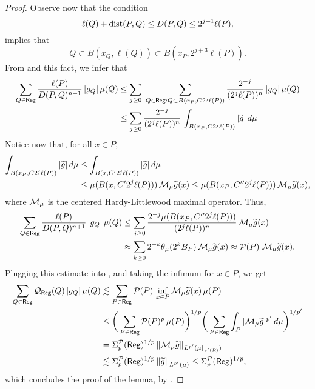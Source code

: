 \begin{proof}
Observe now that the condition
$$\ell(Q) + {\rm dist}(P,Q)\leq D(P,Q)\leq 2^{j+1}\ell(P),$$
implies that 
$$Q\subset B(x_Q,\ell(Q))\subset B(x_P,2^{j+3}\ell(P)).$$
From  and this fact, we infer that
\begin{align*}
\sum_{Q\in{\mathsf{Reg}}} \frac{\ell(P)}{D(P,Q)^{n+1}}\,|g_Q|\,\mu(Q) &
\leq  \sum_{j\geq0}\;
\sum_{Q\in{\mathsf{Reg}}:Q\subset B(x_P,C2^j\ell(P))} \frac{2^{-j}}{(2^j\ell(P))^{n}}\,|g_Q|\,\mu(Q)\\
& \leq\sum_{j\geq0}
 \frac{2^{-j}}{(2^j\ell(P))^{n}}\,\int_{B(x_P,C2^j\ell(P))}|{\widetilde{g}}|\,d\mu
\end{align*}
Notice now that, for all $x\in P$,
\begin{align*}
\int_{B(x_P,C2^j\ell(P))}|{\widetilde{g}}|\,d\mu & \leq \int_{B(x,C'2^j\ell(P))}|{\widetilde{g}}|\,d\mu\\
&\leq \mu(B(x,C'2^j\ell(P)))\,{\mathcal M}_\mu {\widetilde{g}}(x)\leq \mu(B(x_P,C''2^j\ell(P)))\,{\mathcal M}_\mu {\widetilde{g}}(x),
\end{align*}
where ${\mathcal M}_\mu$ is the centered Hardy-Littlewood maximal operator. Thus,
\begin{align*}
\sum_{Q\in{\mathsf{Reg}}} \frac{\ell(P)}{D(P,Q)^{n+1}}\,|g_Q|\,\mu(Q)
& \leq\sum_{j\geq0}
 \frac{2^{-j}\mu(B(x_P,C''2^j\ell(P)))}{(2^j\ell(P))^{n}}\,{\mathcal M}_\mu {\widetilde{g}}(x)\\
 &\approx
 \sum_{k\geq0}
 2^{-k}\theta_\mu(2^kB_P)\,{\mathcal M}_\mu {\widetilde{g}}(x) \approx {\mathcal P}(P)\,\,{\mathcal M}_\mu {\widetilde{g}}(x).
 \end{align*}
Plugging this estimate into , and taking the infimum for $x\in P$, we get
\begin{align*}
\sum_{Q\in{\mathsf{Reg}}} {\mathcal Q}_{\mathsf{Reg}}(Q)\,|g_Q|\,\mu(Q) & \lesssim \sum_{P\in{\mathsf{Reg}}} {\mathcal P}(P)\,\inf_{x\in P}{\mathcal M}_\mu {\widetilde{g}}(x)\,\mu(P)\\
& \leq \bigg(\sum_{P\in{\mathsf{Reg}}} {\mathcal P}(P)^p\,\mu(P)\bigg)^{1/p}
\bigg(\sum_{P\in{\mathsf{Reg}}} \int_P |{\mathcal M}_\mu {\widetilde{g}}|^{p'}\,d\mu\bigg)^{1/p'}\\
& = \Sigma_p^{\mathcal P}({\mathsf{Reg}})^{1/p}\,\|{\mathcal M}_\mu{\widetilde{g}}\|_{L^{p'}(\mu{\lfloor}_{e'(R)})}\\
&\lesssim
\Sigma_p^{\mathcal P}({\mathsf{Reg}})^{1/p}\,\|{\widetilde{g}}\|_{L^{p'}(\mu)}\leq \Sigma_p^{\mathcal P}({\mathsf{Reg}})^{1/p},
\end{align*}
which concludes the proof of the lemma, by .
\end{proof}

